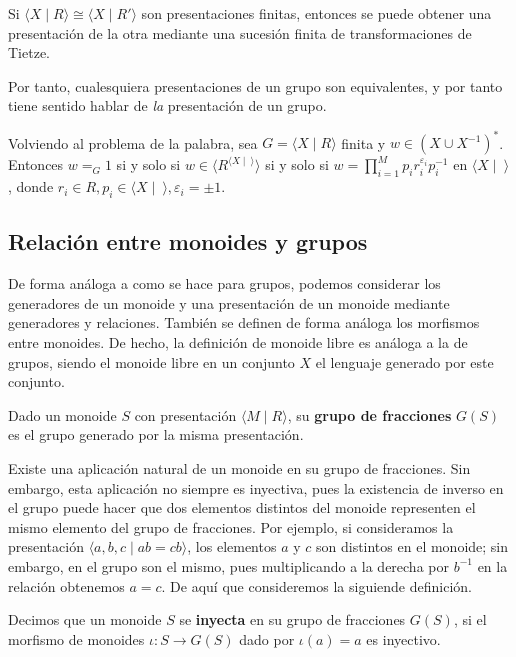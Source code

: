 \documentclass[bibtex, anon]{TEMat-article}
\providecommand{\gene}[1]{\langle{#1}\rangle}
\begin{document}
\begin{teorema}\cite[Proposición 2.1]{combinatorial}
	Si $\gene{X\mid R}\cong\gene{X\mid R'}$ son presentaciones finitas, entonces se puede obtener una presentación de la otra mediante una sucesión finita de transformaciones de Tietze.
\end{teorema}

Por tanto, cualesquiera presentaciones de un grupo son equivalentes, y por tanto tiene sentido hablar de \emph{la} presentación de un grupo. 

Volviendo al problema de la palabra, sea $G=\gene{X\mid R}$ finita y $w\in (X\cup X^{-1})^*$. Entonces $w=_G 1$ si y solo si $w\in \gene{R^{\gene{X\mid\ }}}$ si y solo si $w=\displaystyle\prod_{i=1}^M p_ir_i^{\varepsilon_i}p_i^{-1}$ en $\gene{X\mid\ }$, donde $r_i\in R, p_i\in\gene{X\mid\ }, \varepsilon_i=\pm 1$. 


\subsection{Relación entre monoides y grupos}

De forma análoga a como se hace para grupos, podemos considerar los generadores de un monoide y una presentación de un monoide mediante generadores y relaciones. También se definen de forma análoga los morfismos entre monoides. De hecho, la definición de monoide libre es análoga a la de grupos, siendo el monoide libre en un conjunto $X$ el lenguaje generado por este conjunto.

\begin{definicion}
	Dado un monoide $S$ con presentación $\langle M\mid R\rangle$, su \textbf{grupo de fracciones} $G(S)$ es el grupo generado por la misma presentación.
\end{definicion}

Existe una aplicación natural de un monoide en su grupo de fracciones. Sin embargo, esta aplicación no siempre es inyectiva, pues la existencia de inverso en el grupo puede hacer que dos elementos distintos del monoide representen el mismo elemento del grupo de fracciones. Por ejemplo, si consideramos la presentación $\langle a,b,c\mid ab=cb\rangle$, los elementos $a$ y $c$ son distintos en el monoide; sin embargo, en el grupo son el mismo, pues multiplicando a la derecha por $b^{-1}$ en la relación obtenemos $a=c$. De aquí que consideremos la siguiende definición.

\begin{definicion}
	Decimos que un monoide $S$ se \textbf{inyecta} en su grupo de fracciones $G(S)$, si el morfismo de monoides $\iota: S\to G(S)$ dado por $\iota(a)=a$ es inyectivo.
\end{definicion}
\end{document}
